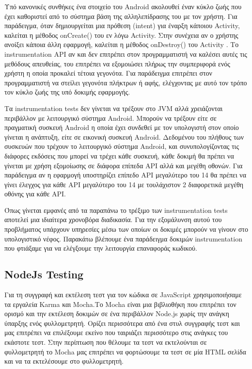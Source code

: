 		Υπό κανονικές συνθήκες ένα στοιχείο του Android ακολουθεί έναν κύκλο ζωής που έχει καθοριστεί από το σύστημα βάση της αλληλεπίδρασης του με τον χρήστη. Για παράδειγμα, όταν δημιουργείται μια πρόθεση (intent) για έναρξη κάποιου Activity, καλείται η μέθοδος onCreate() του εν λόγω Activity. Στην συνέχεια αν ο χρήστης ανοίξει κάποια άλλη εφαρμογή, καλείται η μέθοδος onDestroy() του Activity . Το instrumentation API αν και δεν επιτρέπει στον προγραμματιστή να καλέσει αυτές τις μεθόδους απευθείας, του επιτρέπει να εξομοιώσει πλήρως την συμπεριφορά ενός χρήστη η οποία προκαλεί τέτοια γεγονότα. Για παράδειγμα επιτρέπει στον προγραμματιστή να στείλει γεγονότα πλήκτρων ή αφής, ελέγχοντας με αυτό τον τρόπο τον κύκλο ζωής της υπό δοκιμής εφαρμογής\cite{androidTestingBook}.

		Τα instrumentation tests δεν γίνεται να τρέξουν στο JVM αλλά χρειάζονται περιβάλλον με λειτουργικό σύστημα Android. Μπορούν να τρέξουν είτε σε πραγματική συσκευή Android η οποία έχει συνδεθεί με τον υπολογιστή στον οποίο γίνεται η ανάπτυξη, είτε σε εικονική συσκευή Android. Δεδομένου του πλήθους των συσκευών που τρέχουν το λειτουργικό σύστημα Android, και συνυπολογίζοντας τις διάφορες εκδόσεις που μπορεί να τρέχει κάθε συσκευή, κάθε δοκιμή θα πρέπει να γίνεται με χρήση εξομοίωσης σε διάφορα επίπεδα API αλλά και μεγέθη οθονών. Για παράδειγμα αν η εφαρμογή υποστηρίζει επίπεδο API μεγαλύτερο του 14 θα πρέπει να γίνει έλεγχος για κάθε API μεγαλύτερο του 14 με τουλάχιστον 2 διαφορετικά μεγέθη οθόνης για κάθε API. 
		
		Όπως γίνεται εμφανές από τα παραπάνω το τρέξιμο των instrumentation tests αποτελεί μια ιδιαίτερα χρονοβόρα διαδικασία. Για την εξομάλυνση αυτού του προβλήματος υπάρχουν υπηρεσίες μέσω των οποίων οι δοκιμές μπορούν να γίνουν στο υπολογιστικό νέφος. Παρακάτω βλέπουμε ένα παράδειγμα δοκιμών instrumentation που φτιάξαμε για να ελέγξουμε την λειτουργία επαναφοράς κωδικού.
		
		
		
		\subsection{NodeJs Testing}
		
	
		Για τη συγγραφή και εκτέλεση τεστ για τον κώδικα σε JavaScript χρησιμοποιήσαμε τα εργαλεία Karma και Mocha.Το Mocha είναι μια βιβλιοθήκη που επιτρέπει τον ορισμό και την εκτέλεση δοκιμών σε ένα περιβάλλον Node.js χωρίς την ανάγκη ύπαρξης ενός φυλλομετρητή. Ορίζει περισσότερα από ένα στυλ συγγραφής τεστ και μας επιτρέπει να επιλέξουμε εκείνο που ταιριάζει περισσότερο στις ανάγκες του εκάστοτε τεστ. Στην περίπτωση που θέλουμε τα τεστ να εκτελούνται σε φυλλομετρητή το Mocha μας επιτρέπει να φορτώσουμε τα τεστ σε μία HTML σελίδα και να τα εκτελέσουμε στο φυλλομετρητή.



